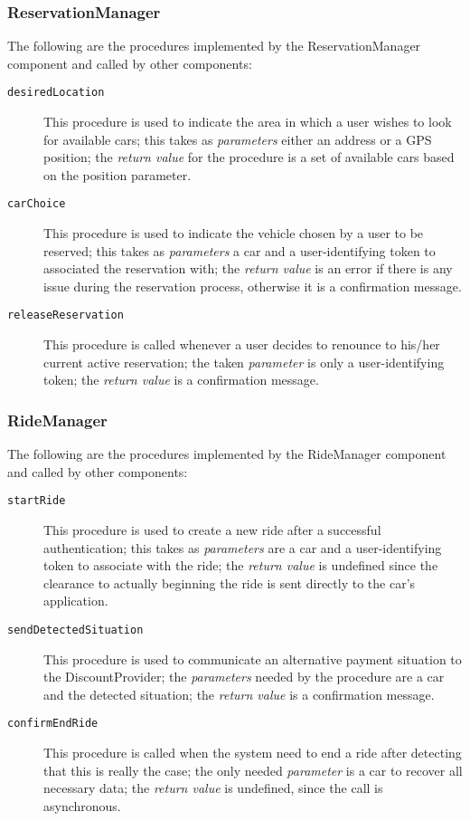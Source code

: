 \subsubsection{ReservationManager}
The following are the procedures implemented by the ReservationManager component and called by other components:
\begin{description}
\item[\texttt{desiredLocation}] This procedure is used to indicate the area in which a user wishes to look for available cars; this takes as \textit{parameters} either an address or a GPS position; the \textit{return value} for the procedure is a set of available cars based on the position parameter.
\item[\texttt{carChoice}] This procedure is used to indicate the vehicle chosen by a user to be reserved; this takes as \textit{parameters} a car and a user-identifying token to associated the reservation with; the \textit{return value} is an error if there is any issue during the reservation process, otherwise it is a confirmation message.
\item[\texttt{releaseReservation}] This procedure is called whenever a user decides to renounce to his/her current active reservation; the taken \textit{parameter} is only a user-identifying token; the \textit{return value} is a confirmation message.
\end{description}
\subsubsection{RideManager}
The following are the procedures implemented by the RideManager component and called by other components:
\begin{description}
\item[\texttt{startRide}] This procedure is used to create a new ride after a successful authentication; this takes as \textit{parameters} are a car and a user-identifying token to associate with the ride; the \textit{return value} is undefined since the clearance to actually beginning the ride is sent directly to the car's application.
\item[\texttt{sendDetectedSituation}] This procedure is used to communicate an alternative payment situation to the DiscountProvider; the \textit{parameters} needed by the procedure are a car and the detected situation; the \textit{return value} is a confirmation message.
\item[\texttt{confirmEndRide}] This procedure is called when the system need to end a ride after detecting that this is really the case; the only needed \textit{parameter} is a car to recover all necessary data; the \textit{return value} is undefined, since the call is asynchronous.
\end{description}
